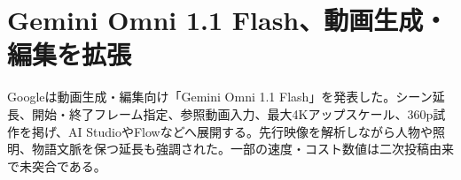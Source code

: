 \section{Gemini Omni 1.1 Flash、動画生成・編集を拡張}
Googleは動画生成・編集向け「Gemini Omni 1.1 Flash」を発表した。シーン延長、開始・終了フレーム指定、参照動画入力、最大4Kアップスケール、360p試作を掲げ、AI StudioやFlowなどへ展開する。先行映像を解析しながら人物や照明、物語文脈を保つ延長も強調された。一部の速度・コスト数値は二次投稿由来で未突合である。
